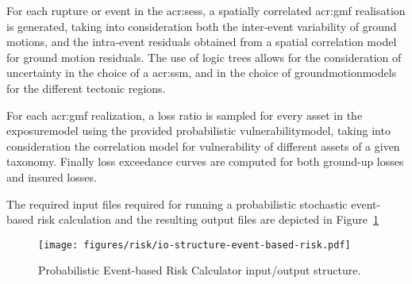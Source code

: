 For each \gls{rupture} or event in the \glspl{acr:ses}, a spatially correlated
\gls{acr:gmf} realisation is generated, taking into consideration both the
inter-event variability of ground motions, and the intra-event residuals
obtained from a spatial correlation model for ground motion residuals. The use
of logic trees allows for the consideration of uncertainty in the choice of a
\glsdesc{acr:ssm}, and in the choice of \glspl{groundmotionmodel} for the
different tectonic regions.

For each \gls{acr:gmf} realization, a loss ratio is sampled for every
\gls{asset} in the \gls{exposuremodel} using the provided probabilistic
\gls{vulnerabilitymodel}, taking into consideration the correlation model for
vulnerability of different \glspl{asset} of a given taxonomy. Finally loss
exceedance curves are computed for both ground-up losses and insured losses.

The required input files required for running a probabilistic stochastic
event-based risk calculation and the resulting output files are depicted in
Figure~\ref{fig:io-structure-event-based-risk}

\begin{figure}[ht]
\centering
\texttt{[image: figures/risk/io-structure-event-based-risk.pdf]}
\caption{Probabilistic Event-based Risk Calculator input/output structure.}
\label{fig:io-structure-event-based-risk}
\end{figure}
